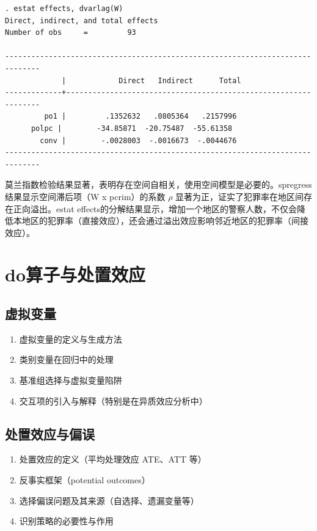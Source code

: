 \begin{tcolorbox}[title=在 Stata 中估计空间滞后模型 (SLM/SAR), colback=white, colframe=black, colbacktitle=white, coltitle=black,fonttitle=\bfseries]
\begin{Verbatim}[commandchars=\\\{\},xleftmargin=2em]
. estat effects, dvarlag(W)
Direct, indirect, and total effects
Number of obs     =         93

------------------------------------------------------------------------------
             |            Direct   Indirect      Total
-------------+----------------------------------------------------------------
         po1 |         .1352632   .0805364   .2157996
      polpc |        -34.85871  -20.75487  -55.61358
        conv |        -.0028003  -.0016673  -.0044676
------------------------------------------------------------------------------
\end{Verbatim}
\end{tcolorbox}

莫兰指数检验结果显著，表明存在空间自相关，使用空间模型是必要的。spregress结果显示空间滞后项（W x pcrim）的系数 $\rho$ 显著为正，证实了犯罪率在地区间存在正向溢出。estat effects的分解结果显示，增加一个地区的警察人数，不仅会降低本地区的犯罪率（直接效应），还会通过溢出效应影响邻近地区的犯罪率（间接效应）。

\section{do算子与处置效应}

\subsection{虚拟变量}
\begin{enumerate}
	\item 虚拟变量的定义与生成方法
	\item 类别变量在回归中的处理
	\item 基准组选择与虚拟变量陷阱
	\item 交互项的引入与解释（特别是在异质效应分析中）
\end{enumerate}

\subsection{处置效应与偏误}
\begin{enumerate}
	\item 处置效应的定义（平均处理效应 ATE、ATT 等）
	\item 反事实框架（potential outcomes）
	\item 选择偏误问题及其来源（自选择、遗漏变量等）
	\item 识别策略的必要性与作用
\end{enumerate}

